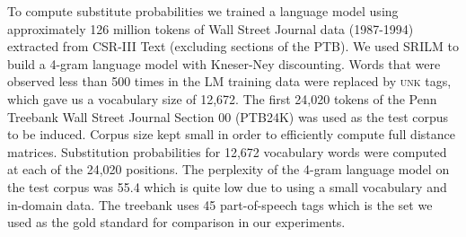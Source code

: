 
To compute substitute probabilities we trained a language model using
approximately 126 million tokens of Wall Street Journal data
(1987-1994) extracted from CSR-III Text \cite{csr3text} (excluding
sections of the PTB).
We used SRILM \cite{Stolcke2002} to build a 4-gram language model with
Kneser-Ney discounting.
Words that were observed less than 500 times in the LM training data
were replaced by \textsc{unk} tags, which gave us a vocabulary size of
12,672.
The first 24,020 tokens of the Penn Treebank Wall Street Journal
Section 00 (PTB24K) was used as the test corpus to be induced.  Corpus
size kept small in order to efficiently compute full distance
matrices.  Substitution probabilities for 12,672 vocabulary words were
computed at each of the 24,020 positions.
The perplexity of the 4-gram language model on the test corpus was
55.4 which is quite low due to using a small 
vocabulary and in-domain data.
The treebank uses 45 part-of-speech tags which is the set we used as
the gold standard for comparison in our experiments.

